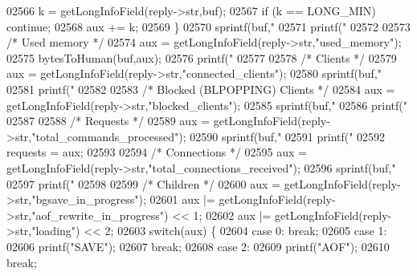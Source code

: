 \begin{DoxyCode}
{{{{{{{{{{{{{{{{{{{{{{{{{{{{{{{{{{{{{{{{{{{{{{{{{{{{{{{{{{{{{{{{{{{{{{{{{{{{{{{{{{{{{{{{{02566             k = getLongInfoField(reply->str,buf);
02567             \textcolor{keywordflow}{if} (k == LONG\_MIN) \textcolor{keywordflow}{continue};
02568             aux += k;
02569         \}
02570         sprintf(buf,\textcolor{stringliteral}{"%
02571         printf(\textcolor{stringliteral}{"%
02572 
02573         \textcolor{comment}{/* Used memory */}
02574         aux = getLongInfoField(reply->str,\textcolor{stringliteral}{"used\_memory"});
02575         bytesToHuman(buf,aux);
02576         printf(\textcolor{stringliteral}{"%
02577 
02578         \textcolor{comment}{/* Clients */}
02579         aux = getLongInfoField(reply->str,\textcolor{stringliteral}{"connected\_clients"});
02580         sprintf(buf,\textcolor{stringliteral}{"%
02581         printf(\textcolor{stringliteral}{" %
02582 
02583         \textcolor{comment}{/* Blocked (BLPOPPING) Clients */}
02584         aux = getLongInfoField(reply->str,\textcolor{stringliteral}{"blocked\_clients"});
02585         sprintf(buf,\textcolor{stringliteral}{"%
02586         printf(\textcolor{stringliteral}{"%
02587 
02588         \textcolor{comment}{/* Requests */}
02589         aux = getLongInfoField(reply->str,\textcolor{stringliteral}{"total\_commands\_processed"});
02590         sprintf(buf,\textcolor{stringliteral}{"%
02591         printf(\textcolor{stringliteral}{"%
02592         requests = aux;
02593 
02594         \textcolor{comment}{/* Connections */}
02595         aux = getLongInfoField(reply->str,\textcolor{stringliteral}{"total\_connections\_received"});
02596         sprintf(buf,\textcolor{stringliteral}{"%
02597         printf(\textcolor{stringliteral}{" %
02598 
02599         \textcolor{comment}{/* Children */}
02600         aux = getLongInfoField(reply->str,\textcolor{stringliteral}{"bgsave\_in\_progress"});
02601         aux |= getLongInfoField(reply->str,\textcolor{stringliteral}{"aof\_rewrite\_in\_progress"}) << 1;
02602         aux |= getLongInfoField(reply->str,\textcolor{stringliteral}{"loading"}) << 2;
02603         \textcolor{keywordflow}{switch}(aux) \{
02604         \textcolor{keywordflow}{case} 0: \textcolor{keywordflow}{break};
02605         \textcolor{keywordflow}{case} 1:
02606             printf(\textcolor{stringliteral}{"SAVE"});
02607             \textcolor{keywordflow}{break};
02608         \textcolor{keywordflow}{case} 2:
02609             printf(\textcolor{stringliteral}{"AOF"});
02610             \textcolor{keywordflow}{break};
}}}}}}}}}}}}}}}}}}}}}}}}}}}}}}}}}}}}}}}}}}}}}}}}}}}}}}}}}}}}}}}}}}}}}}}}}}}}}}}}}}}}}}}}}}}}}}}}}}}}
\end{DoxyCode}
